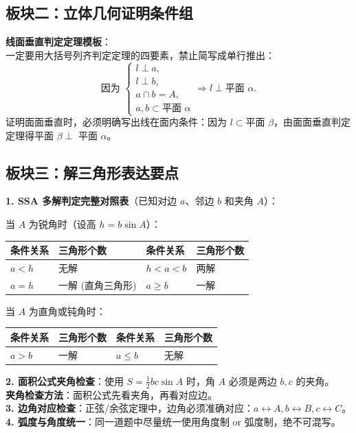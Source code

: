 \documentclass[11pt,a4paper]{ctexart}
\begin{document}
\subsection{板块二：立体几何证明条件组}
\begin{decisionscan}
  \textbf{线面垂直判定定理模板}：\\
  一定要用大括号列齐判定定理的四要素，禁止简写成单行推出：
  \[
    \text{因为 }
    \begin{cases}
      l \perp a, \\
      l \perp b, \\
      a \cap b = A, \\
      a, b \subset \text{平面 } \alpha
    \end{cases}
    \Rightarrow l \perp \text{平面 } \alpha.
  \]
  证明面面垂直时，必须明确写出线在面内条件：因为 \(l \subset \text{平面 } \beta\)，由面面垂直判定定理得平面 \(\beta \perp\) 平面 \(\alpha\)。
\end{decisionscan}

\subsection{板块三：解三角形表达要点}
\begin{decisionscan}
  \textbf{1. SSA 多解判定完整对照表}（已知对边 \(a\)、邻边 \(b\) 和夹角 \(A\)）：
  
  当 \(A\) 为锐角时（设高 \(h = b\sin A\)）：
  \begin{center}
    \begin{tabular}{|p{2.2cm}|p{3.2cm}||p{2.2cm}|p{3.2cm}|}
      \hline
      条件关系 & 三角形个数 & 条件关系 & 三角形个数 \\ \hline
      \(a < h\) & 无解 & \(h < a < b\) & 两解 \\ \hline
      \(a = h\) & 一解 (直角三角形) & \(a \ge b\) & 一解 \\ \hline
    \end{tabular}
  \end{center}
  
  当 \(A\) 为直角或钝角时：
  \begin{center}
    \begin{tabular}{|p{2.2cm}|p{3.2cm}||p{2.2cm}|p{3.2cm}|}
      \hline
      条件关系 & 三角形个数 & 条件关系 & 三角形个数 \\ \hline
      \(a > b\) & 一解 & \(a \le b\) & 无解 \\ \hline
    \end{tabular}
  \end{center}
  
  \textbf{2. 面积公式夹角检查}：使用 \(S = \frac{1}{2}bc\sin A\) 时，角 \(A\) 必须是两边 \(b, c\) 的夹角。\\
  \textbf{夹角检查方法}：面积公式先看夹角，再看对应边。\\
  \textbf{3. 边角对应检查}：正弦/余弦定理中，边角必须准确对应：\(a \leftrightarrow A, b \leftrightarrow B, c \leftrightarrow C\)。\\
  \textbf{4. 弧度与角度统一}：同一道题中尽量统一使用角度制 or 弧度制，绝不可混写。
\end{decisionscan}
\end{document}

